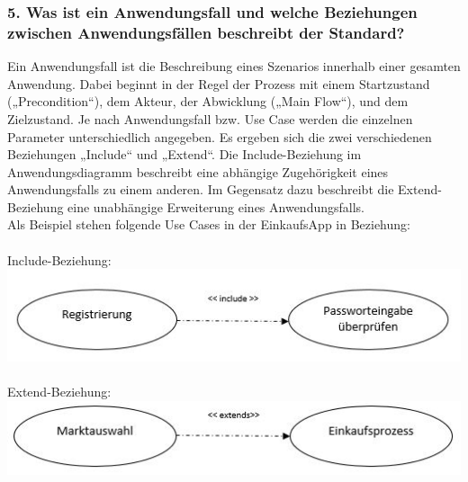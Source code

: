 \documentclass[12pt,a4paper]{article}
\begin{document}
 
\subsubsection*{5. Was ist ein Anwendungsfall und welche Beziehungen zwischen Anwendungsfällen beschreibt der Standard?}
Ein Anwendungsfall ist die Beschreibung eines Szenarios innerhalb einer gesamten Anwendung. 
Dabei beginnt in der Regel der Prozess mit einem Startzustand („Precondition“), dem Akteur, der Abwicklung („Main Flow“), und dem Zielzustand. 
Je nach Anwendungsfall bzw. Use Case werden die einzelnen Parameter unterschiedlich angegeben. Es ergeben sich die zwei verschiedenen Beziehungen „Include“ und „Extend“.
Die Include-Beziehung im Anwendungsdiagramm beschreibt eine abhängige Zugehörigkeit eines Anwendungsfalls zu einem anderen. Im Gegensatz dazu beschreibt die Extend-Beziehung eine unabhängige Erweiterung eines Anwendungsfalls.
\\
Als Beispiel stehen folgende Use Cases in der EinkaufsApp in Beziehung:
\\
\\
Include-Beziehung:
\\
\includegraphics[scale=1]{Include_Use-Case.jpg}
\\
\\
Extend-Beziehung:
\\
\includegraphics[scale=1]{Extend_Use-Case.jpg}
\\
\newpage
\end{document}
